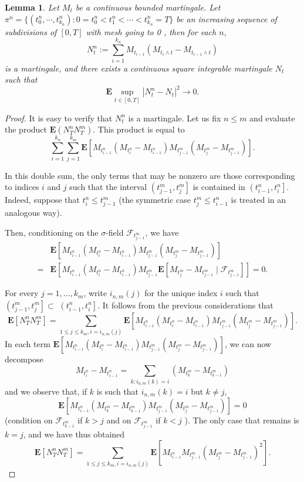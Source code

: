 \documentclass[twoside, 12pt]{book}
\numberwithin{equation}{chapter}
\newtheorem{lemma}[theorem]{Lemma}
\def\bE{{\mathbf E}}
\def\leq{\leqslant}
\begin{document}
	\begin{lemma}\label{lem:quadratic}
		Let $M_t$ be a continuous bounded martingale.  Let $\pi^n=\{(t_0^n,\cdots, t_{k_n}^n): 0=t_0^n<t_1^n<\cdots<t_{k_n}^n=T\}$ be an increasing sequence of subdivisions of $[0, T]$ with mesh going to 0 , then for each $n$, 
		$$
		N^n_t:= \sum_{i=1}^{k_n}M_{t_{i-1}}(M_{t_i\wedge t}-M_{t_{i-1}\wedge t})
		$$ 
		is a martingale, and there exists a  continuous square integrable martingale $N_t$ such that 
		\[
		\bE \sup_{t\in [0,T]} |N_t^n-N_t|^2 \to 0. 
		\]
	\end{lemma}
	\begin{proof}
		It is easy to verify that $N_t^n$ is a martingale. 
		Let us fix $n \leq m$ and evaluate the product $\bE\left(N_T^n N_T^m\right)$. This product is equal to
		$$
		\sum_{i=1}^{k_n} \sum_{j=1}^{k_m} \bE\left[M_{t_{i-1}^n}\left(M_{t_i^n}-M_{t_{i-1}^n}\right) M_{t_{j-1}^m}\left(M_{t_j^m}-M_{t_{j-1}^m}\right)\right] .
		$$
		
		In this double sum, the only terms that may be nonzero are those corresponding to indices $i$ and $j$ such that the interval $\left(t_{j-1}^m, t_j^m\right]$ is contained in $\left(t_{i-1}^n, t_i^n\right]$. Indeed, suppose that $t_i^n \leq t_{j-1}^m$ (the symmetric case $t_j^m \leq t_{i-1}^n$ is treated in an analogous way).
		
		Then, conditioning on the $\sigma$-field $\mathscr{F}_{t_{j-1}^m}$, we have
		$$
		\begin{aligned}
			& \bE\left[M_{t_{i-1}^n}\left(M_{t_i^n}-M_{t_{i-1}^n}\right) M_{t_{j-1}^m}\left(M_{t_j^m}-M_{t_{j-1}^m}\right)\right] \\
			=& \bE\left[M_{t_{i-1}^n}\left(M_{t_i^n}-M_{t_{i-1}^n}\right) M_{t_{j-1}^m} \bE\left[M_{t_j^m}-M_{t_{j-1}^m} \mid \mathscr{F}_{t_{j-1}^m}\right]\right]=0 .
		\end{aligned}
		$$
		
		For every $j=1, \ldots, k_m$, write $i_{n, m}(j)$ for the unique index $i$ such that $\left(t_{j-1}^m, t_j^m\right] \subset$ $\left(t_{i-1}^n, t_i^n\right]$. It follows from the previous considerations that
		$$
		\bE\left[N_T^n N_T^m\right]=\sum_{1 \leq j \leq k_m, i=i_{n, m}(j)} \bE\left[M_{t_{i-1}^n}\left(M_{t_i^n}-M_{t_{i-1}^n}\right) M_{t_{j-1}^m}\left(M_{t_j^m}-M_{t_{j-1}^m}\right)\right] .
		$$
		In each term $\bE\left[M_{t_{i-1}^n}\left(M_{t_i^n}-M_{t_{i-1}^n}\right) M_{t_{j-1}^m}\left(M_{t_j^m}-M_{t_{j-1}^m}\right)\right]$, we can now decompose
		$$
		M_{t_i^n}-M_{t_{i-1}^n}=\sum_{k: i_{n, m}(k)=i}\left(M_{t_k^m}-M_{t_{k-1}^m}\right)
		$$
		and we observe that, if $k$ is such that $i_{n, m}(k)=i$ but $k \neq j$,
		$$
		\bE\left[M_{t_{i-1}^n}\left(M_{t_k^m}-M_{t_{k-1}^m}\right) M_{t_{j-1}^m}\left(M_{t_j^m}-M_{t_{j-1}^m}\right)\right]=0
		$$
		(condition on $\mathscr{F}_{t_{k-1}^m}$ if $k>j$ and on $\mathscr{F}_{t_{j-1}^m}$ if $k<j$ ). The only case that remains is $k=j$, and we have thus obtained
		$$
		\bE\left[N_T^n N_T^m\right]=\sum_{1 \leq j \leq k_m, i=i_{n, m}(j)} \bE\left[M_{t_{i-1}^n} M_{t_{j-1}^m}\left(M_{t_j^m}-M_{t_{j-1}^m}\right)^2\right] .
		$$
		

\end{proof}
\end{document}
